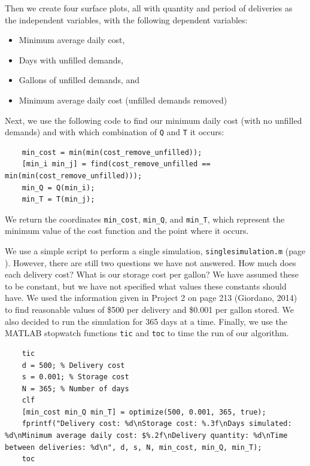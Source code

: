 \documentclass{article}
\begin{document}
    Then we create four surface plots, all with quantity and period of deliveries as the independent variables, with the following dependent variables:
    \begin{itemize}
        \item Minimum average daily cost,
        \item Days with unfilled demands,
        \item Gallons of unfilled demands, and
        \item Minimum average daily cost (unfilled demands removed)
    \end{itemize}

    Next, we use the following code to find our minimum daily cost (with no unfilled demands) and with which combination of \texttt{Q} and \texttt{T} it occurs:

    \begin{verbatim}
    min_cost = min(min(cost_remove_unfilled));
    [min_i min_j] = find(cost_remove_unfilled == min(min(cost_remove_unfilled)));
    min_Q = Q(min_i);
    min_T = T(min_j);
    \end{verbatim}

    We return the coordinates \texttt{min\_cost}, \texttt{min\_Q}, and \texttt{min\_T}, which represent the minimum value of the cost function and the point where it occurs.

    We use a simple script to perform a single simulation, \texttt{singlesimulation.m} (page \pageref{code:singlesimulation}). However, there are still two questions we have not answered. How much does each delivery cost? What is our storage cost per gallon? We have assumed these to be constant, but we have not specified what values these constants should have. We used the information given in Project 2 on page 213 (Giordano, 2014) to find reasonable values of \$500 per delivery and \$0.001 per gallon stored. We also decided to run the simulation for 365 days at a time. Finally, we use the MATLAB stopwatch functions \texttt{tic} and \texttt{toc} to time the run of our algorithm.

    \begin{verbatim}
    tic
    d = 500; % Delivery cost
    s = 0.001; % Storage cost
    N = 365; % Number of days
    clf
    [min_cost min_Q min_T] = optimize(500, 0.001, 365, true);
    fprintf("Delivery cost: %d\nStorage cost: %.3f\nDays simulated: %d\nMinimum average daily cost: $%.2f\nDelivery quantity: %d\nTime between deliveries: %d\n", d, s, N, min_cost, min_Q, min_T);
    toc
    \end{verbatim}
\end{document}
